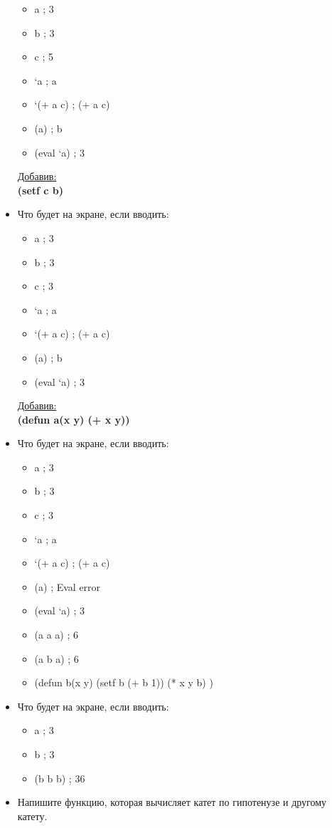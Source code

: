 \begin{itemize}
\begin{itemize}
			\item a ; 3
			\item b ; 3
			\item c ; 5
			\item `a ; a
			\item `(+ a c) ; (+ a c)
			\item (a) ; b
			\item (eval `a) ; 3
		\end{itemize}
	\underline{Добавив:}\\
	\textbf{(setf c b)}
	\item Что будет на экране, если вводить:
		\begin{itemize}
			\item a ; 3
			\item b ; 3
			\item c ; 3
			\item `a ; a
			\item `(+ a c) ; (+ a c)
			\item (a) ; b
			\item (eval `a) ; 3
		\end{itemize}
	\underline{Добавив:}\\
	\textbf{(defun a(x y) (+ x y))}
	\item Что будет на экране, если вводить:
		\begin{itemize}
			\item a ; 3
			\item b ; 3
			\item c ; 3
			\item `a ; a
			\item `(+ a c) ; (+ a c)
			\item (a) ; Eval error
			\item (eval `a) ; 3
			\item (a a a) ; 6
			\item (a b a) ; 6
		\end{itemize}
	\hrulefill 
\begin{itemize}
	\item (defun b(x y) (setf b (+ b 1)) (* x y b) ) 
\end{itemize}
	\hrulefill
	\item Что будет на экране, если вводить:
		\begin{itemize}
			\item a ; 3
			\item b ; 3
			\item (b b b) ; 36
		\end{itemize}
	\item Напишите функцию, которая вычисляет катет по гипотенузе и другому катету.

\end{itemize}
